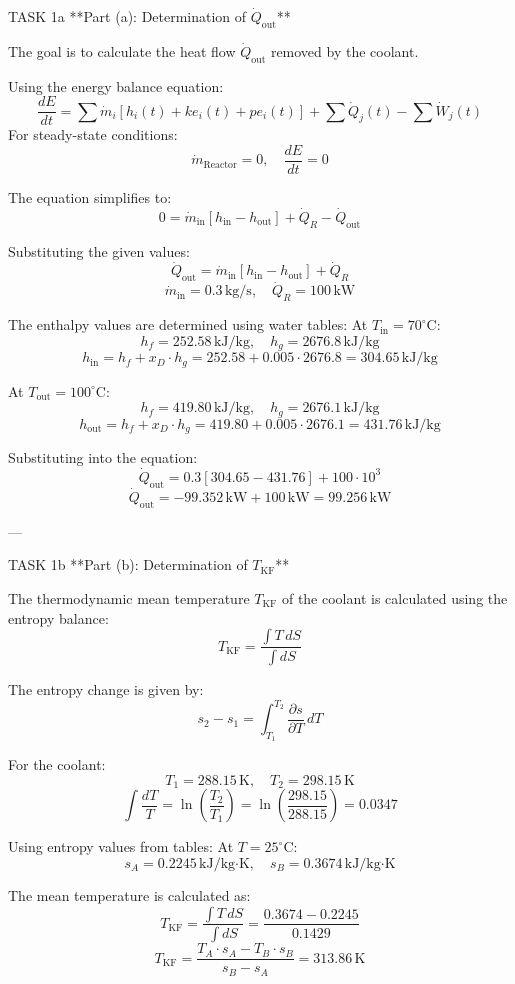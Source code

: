 TASK 1a  
**Part (a): Determination of \( \dot{Q}_{\text{out}} \)**  

The goal is to calculate the heat flow \( \dot{Q}_{\text{out}} \) removed by the coolant.  

Using the energy balance equation:  
\[
\frac{dE}{dt} = \sum \dot{m}_i \left[ h_i(t) + ke_i(t) + pe_i(t) \right] + \sum \dot{Q}_j(t) - \sum \dot{W}_j(t)
\]  
For steady-state conditions:  
\[
\dot{m}_{\text{Reactor}} = 0, \quad \frac{dE}{dt} = 0
\]  

The equation simplifies to:  
\[
0 = \dot{m}_{\text{in}} \left[ h_{\text{in}} - h_{\text{out}} \right] + \dot{Q}_R - \dot{Q}_{\text{out}}
\]  

Substituting the given values:  
\[
\dot{Q}_{\text{out}} = \dot{m}_{\text{in}} \left[ h_{\text{in}} - h_{\text{out}} \right] + \dot{Q}_R
\]  
\[
\dot{m}_{\text{in}} = 0.3 \, \text{kg/s}, \quad \dot{Q}_R = 100 \, \text{kW}
\]  

The enthalpy values are determined using water tables:  
At \( T_{\text{in}} = 70^\circ\text{C} \):  
\[
h_f = 252.58 \, \text{kJ/kg}, \quad h_g = 2676.8 \, \text{kJ/kg}
\]  
\[
h_{\text{in}} = h_f + x_D \cdot h_g = 252.58 + 0.005 \cdot 2676.8 = 304.65 \, \text{kJ/kg}
\]  

At \( T_{\text{out}} = 100^\circ\text{C} \):  
\[
h_f = 419.80 \, \text{kJ/kg}, \quad h_g = 2676.1 \, \text{kJ/kg}
\]  
\[
h_{\text{out}} = h_f + x_D \cdot h_g = 419.80 + 0.005 \cdot 2676.1 = 431.76 \, \text{kJ/kg}
\]  

Substituting into the equation:  
\[
\dot{Q}_{\text{out}} = 0.3 \left[ 304.65 - 431.76 \right] + 100 \cdot 10^3
\]  
\[
\dot{Q}_{\text{out}} = -99.352 \, \text{kW} + 100 \, \text{kW} = 99.256 \, \text{kW}
\]  

---

TASK 1b  
**Part (b): Determination of \( T_{\text{KF}} \)**  

The thermodynamic mean temperature \( T_{\text{KF}} \) of the coolant is calculated using the entropy balance:  
\[
T_{\text{KF}} = \frac{\int T \, dS}{\int dS}
\]  

The entropy change is given by:  
\[
s_2 - s_1 = \int_{T_1}^{T_2} \frac{\partial s}{\partial T} \, dT
\]  

For the coolant:  
\[
T_1 = 288.15 \, \text{K}, \quad T_2 = 298.15 \, \text{K}
\]  
\[
\int \frac{dT}{T} = \ln \left( \frac{T_2}{T_1} \right) = \ln \left( \frac{298.15}{288.15} \right) = 0.0347
\]  

Using entropy values from tables:  
At \( T = 25^\circ\text{C} \):  
\[
s_A = 0.2245 \, \text{kJ/kg·K}, \quad s_B = 0.3674 \, \text{kJ/kg·K}
\]  

The mean temperature is calculated as:  
\[
T_{\text{KF}} = \frac{\int T \, dS}{\int dS} = \frac{0.3674 - 0.2245}{0.1429}
\]  
\[
T_{\text{KF}} = \frac{T_A \cdot s_A - T_B \cdot s_B}{s_B - s_A} = 313.86 \, \text{K}
\]  

